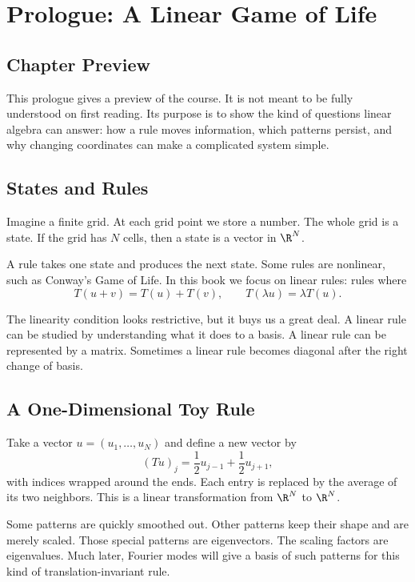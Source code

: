 \chapter{Prologue: A Linear Game of Life}
\label{ch:prologue}

\section*{Chapter Preview}

This prologue gives a preview of the course. It is not meant to be fully
understood on first reading. Its purpose is to show the kind of questions
linear algebra can answer: how a rule moves information, which patterns
persist, and why changing coordinates can make a complicated system simple.

\section{States and Rules}

Imagine a finite grid. At each grid point we store a number. The whole grid is
a state. If the grid has $N$ cells, then a state is a vector in $\R^N$.

A rule takes one state and produces the next state. Some rules are nonlinear,
such as Conway's Game of Life. In this book we focus on linear rules: rules
where
\[
  T(u+v)=T(u)+T(v),
  \qquad
  T(\lambda u)=\lambda T(u).
\]

The linearity condition looks restrictive, but it buys us a great deal. A
linear rule can be studied by understanding what it does to a basis. A linear
rule can be represented by a matrix. Sometimes a linear rule becomes diagonal
after the right change of basis.

\section{A One-Dimensional Toy Rule}

Take a vector $u=(u_1,\ldots,u_N)$ and define a new vector by
\[
  (Tu)_j = \frac{1}{2}u_{j-1}+\frac{1}{2}u_{j+1},
\]
with indices wrapped around the ends. Each entry is replaced by the average of
its two neighbors. This is a linear transformation from $\R^N$ to $\R^N$.

Some patterns are quickly smoothed out. Other patterns keep their shape and
are merely scaled. Those special patterns are eigenvectors. The scaling factors
are eigenvalues. Much later, Fourier modes will give a basis of such patterns
for this kind of translation-invariant rule.

